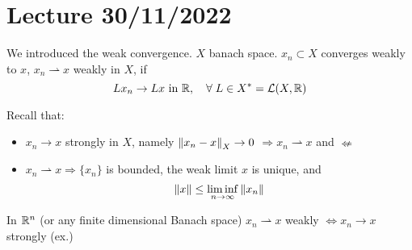 \section{Lecture 30/11/2022}

We introduced the weak convergence. \(X\) banach space. \({x_n} \subset X\) converges weakly to \(x\), \(x_n \rightharpoonup x\) weakly in \(X\), if 
\[
    L x_n \to Lx \text { in } \mathbb{R}, \quad \forall\; L \in X^* = \mathcal{L}(X, \mathbb{R})
\]

Recall that: 
\begin{itemize}
    \item \(x_n \to x \) strongly in \(X\), namely \(\norm{x_n - x}_X \to 0\) \(\Rightarrow x_n \rightharpoonup x\) and \(\nLeftarrow\)
    \item \(x_n \rightharpoonup x \Rightarrow \{x_n\}\) is bounded, the weak limit \(x\) is unique, and 
    \[
        \norm{x} \leq \liminf _{n \to \infty} \norm{x_n}
    \]
\end{itemize}

\begin{remark}
    In \(\mathbb{R}^n\) (or any finite dimensional Banach space) \(x_n \rightharpoonup x\) weakly \(\Leftrightarrow x_n \to x\) strongly (ex.)
\end{remark}

